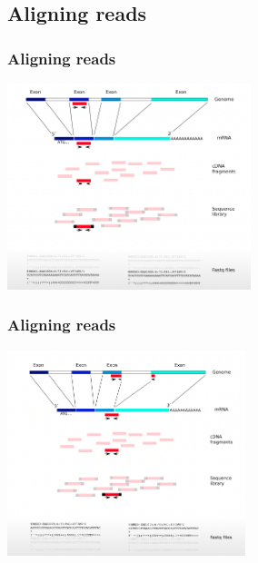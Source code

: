 \documentclass{beamer}\usepackage[]{graphicx}\usepackage[]{color}
\begin{document}
\subsection{Aligning reads}
\begin{frame}
\frametitle{Aligning reads}
\centering
\includegraphics[height=6cm]{Images/map1.png}
\end{frame}

\begin{frame}
\frametitle{Aligning reads}
\centering
\includegraphics[height=6cm]{Images/map2.png}
\end{frame}
\end{document}
